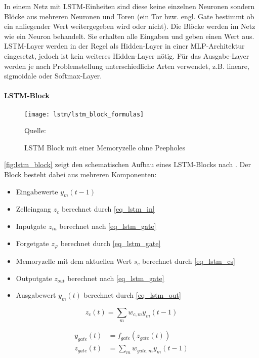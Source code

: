 In einem Netz mit \ac{LSTM}-Einheiten sind diese keine einzelnen Neuronen
sondern Blöcke aus mehreren Neuronen und Toren (ein Tor bzw. engl.
Gate bestimmt ob ein anliegender Wert weitergegeben wird oder nicht).
Die Blöcke werden im Netz wie ein Neuron behandelt. Sie erhalten alle Eingaben
und geben einen Wert aus. \ac{LSTM}-Layer werden in der Regel als Hidden-Layer
in einer \ac{MLP}-Architektur eingesetzt, jedoch ist kein weiteres Hidden-Layer
nötig. Für das Ausgabe-Layer werden je nach Problemstellung unterschiedliche
Arten verwendet, z.B. lineare, sigmoidale oder Softmax-Layer.

\paragraph{\ac{LSTM}-Block}

\begin{figure*}[htfp]
	\begin{center}
	\texttt{[image: lstm/lstm\_block\_formulas]}
	\caption[\acs{LSTM} Block]{\acs{LSTM} Block mit einer Memoryzelle ohne
	Peepholes} \tiny Quelle: \cite{Gers2002b}
	\label{fig:lstm_block}
	\end{center}
\end{figure*}  

\autoref{fig:lstm_block} zeigt den schematischen Aufbau eines \ac{LSTM}-Blocks
nach \cite{Gers2002b}. Der Block besteht dabei aus mehreren Komponenten: 
\begin{itemize}
	\item Eingabewerte $y_m(t-1)$
	\item Zelleingang $z_c$ berechnet durch \autoref{eq_lstm_in}
	\item Inputgate $z_{in}$ berechnet nach \autoref{eq_lstm_gate}
	\item Forgetgate $z_\varphi$ berechnet durch \autoref{eq_lstm_gate}
	\item Memoryzelle mit dem aktuellen Wert $s_c$ berechnet durch
	\autoref{eq_lstm_cs}
	\item Outputgate $z_{out}$ berechnet nach \autoref{eq_lstm_gate}
	\item Ausgabewert $y_m(t)$ berechnet durch \autoref{eq_lstm_out}
\end{itemize}

\begin{equation}
\label{eq_lstm_in}
z_{c}(t) = \sum \limits_{m} w_{c,m}y_m(t-1)
\end{equation}

\begin{equation}
\label{eq_lstm_gate}
\begin{split}
y_{gate}(t) &= f_{gate}(z_{gate}(t))\\
z_{gate}(t) &= \sum \limits_{m} w_{gate,m}y_m(t-1)
\end{split}
\end{equation}

